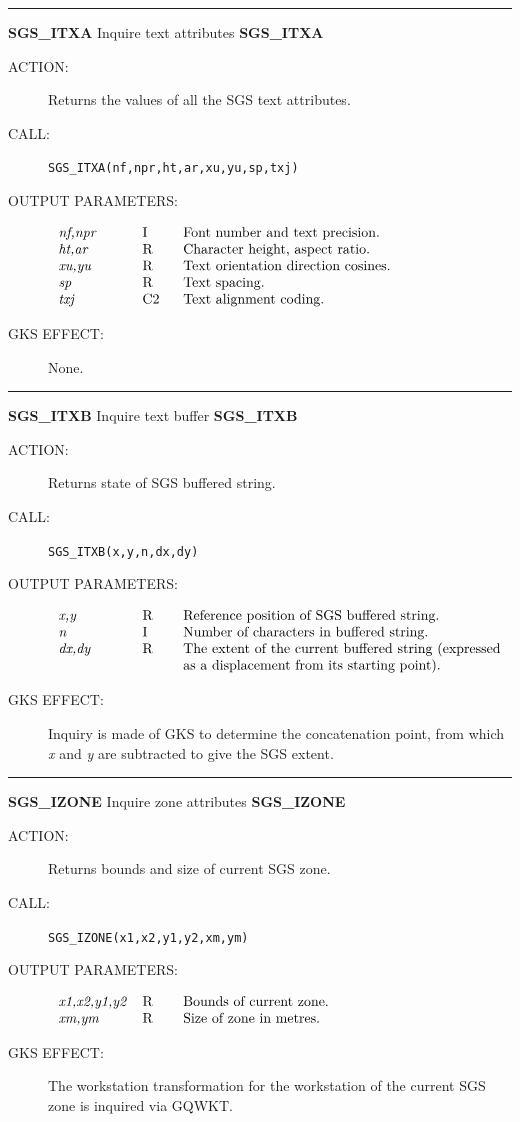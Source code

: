 \documentclass[11pt]{article}
\newcommand{\xlabel}[1]{}
\newcommand{\rthead}[2]{\rule{\textwidth}{0.3mm}
{\Large {\bf #1} \hfill #2 \hfill {\bf #1}}}
\newenvironment{params}%
{\[\begin{tabular}{p{0.14\textwidth}p{0.05\textwidth}p{0.66\textwidth}}}%
{\end{tabular}\]}
\newcommand{\rparams}[3]{{\em #1} &#2 &#3\\}
\newcommand{\rthead}[2]{\subsection{\label{#1}\xlabel{#1}#1 - #2}}
\newenvironment{params}{\begin{description}}{\end{description}}
\newcommand{\rparams}[3]{\item{{\em #1}} (#2) #3}
\begin{document}
\rthead{SGS\_ITXA}{Inquire text attributes}
\begin{description}
\item [ACTION:]
Returns the values of all the SGS text attributes.
\item [CALL:]
{\tt SGS\_ITXA(nf,npr,ht,ar,xu,yu,sp,txj)}
\item [OUTPUT PARAMETERS:]
\begin{params}
\rparams{nf,npr}{I}{Font number and text precision.}
\rparams{ht,ar}{R}{Character height, aspect ratio.}
\rparams{xu,yu}{R}{Text orientation direction cosines.}
\rparams{sp}{R}{Text spacing.}
\rparams{txj}{C2}{Text alignment coding.}
\end{params}
\item [GKS EFFECT:]
None.
\end{description}
\goodbreak

\rthead{SGS\_ITXB}{Inquire text buffer}
\begin{description}
\item [ACTION:]
Returns state of SGS buffered string.
\item [CALL:]
{\tt SGS\_ITXB(x,y,n,dx,dy)}
\item [OUTPUT PARAMETERS:]
\begin{params}
\rparams{x,y}{R}{Reference position of SGS buffered string.}
\rparams{n}{I}{Number of characters in buffered string.}
\rparams{dx,dy}{R}{The extent of the current buffered string (expressed as a
displacement from its starting point).}
\end{params}
\item [GKS EFFECT:]
Inquiry is made of GKS to determine the concatenation point, from 
which {\em x}\/ and {\em y}\/ are subtracted to give the SGS extent.
\end{description}
\goodbreak

\rthead{SGS\_IZONE}{Inquire zone attributes}
\begin{description}
\item [ACTION:]
Returns bounds and size of current SGS zone.
\item [CALL:]
{\tt SGS\_IZONE(x1,x2,y1,y2,xm,ym)}
\item [OUTPUT PARAMETERS:]
\begin{params}
\rparams{x1,x2,y1,y2}{R}{Bounds of current zone.}
\rparams{xm,ym}{R}{Size of zone in metres.}
\end{params}
\item [GKS EFFECT:]
The workstation transformation for the workstation of the current SGS zone is
inquired via GQWKT.
\end{description}
\goodbreak
\end{document}

